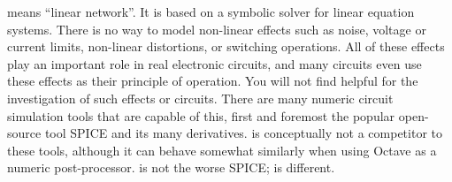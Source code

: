 \linnet{} means ``linear network''. It is based on a symbolic solver for
linear equation systems. There is no way to model non-linear effects such
as noise, voltage or current limits, non-linear distortions, or switching
operations. All of these effects play an important role in real electronic
circuits, and many circuits even use these effects as their principle of
operation. You will not find \linnet{} helpful for the investigation of
such effects or circuits. There are many numeric circuit simulation tools
that are capable of this, first and foremost the popular open-source tool
SPICE and its many derivatives. \linnet{} is conceptually not a competitor
to these tools, although it can behave somewhat similarly when using
Octave as a numeric post-processor. \linnet{} is not the worse SPICE;
\linnet{} is different. 